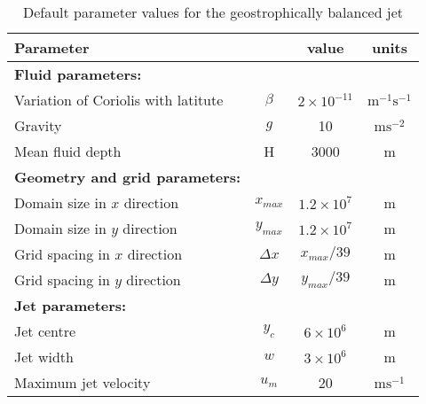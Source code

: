 \noindent \begin{center}
\begin{table}
\renewcommand{\arraystretch}{1.2}

\noindent \begin{centering}
\begin{tabular}{|l|c|c|c|}
\hline 
\textbf{Parameter} &  & value & units\tabularnewline
\hline 
\hline 
\textbf{Fluid parameters:} &  &  & \tabularnewline
\hline 
Variation of Coriolis with latitute & $\beta$ & $2\times10^{-11}$ & $\text{m}^{-1}\text{s}^{-1}$\tabularnewline
\hline 
Gravity & $g$ & 10 & $\text{m}\text{s}^{-2}$\tabularnewline
\hline 
Mean fluid depth & H & 3000 & m\tabularnewline
\hline 
\textbf{Geometry and grid parameters:} &  &  & \tabularnewline
\hline 
Domain size in $x$ direction & $x_{max}$ & $1.2\times10^{7}$ & m\tabularnewline
\hline 
Domain size in $y$ direction & $y_{max}$ & $1.2\times10^{7}$ & m\tabularnewline
\hline 
Grid spacing in $x$ direction & $\Delta x$ & $x_{max}/39$ & m\tabularnewline
\hline 
Grid spacing in $y$ direction & $\Delta y$ & $y_{max}/39$ & m\tabularnewline
\hline 
\textbf{Jet parameters:} &  &  & \tabularnewline
\hline 
Jet centre & $y_{c}$ & $6\times10^{6}$ & m\tabularnewline
\hline 
Jet width & $w$ & $3\times10^{6}$ & m\tabularnewline
\hline 
Maximum jet velocity & $u_{m}$ & 20 & $\text{m}\text{s}^{-1}$\tabularnewline
\hline 
\end{tabular}
\par\end{centering}

\caption{Default parameter values for the geostrophically balanced jet\label{tab:SWEparameters}}
\end{table}

\par\end{center}

